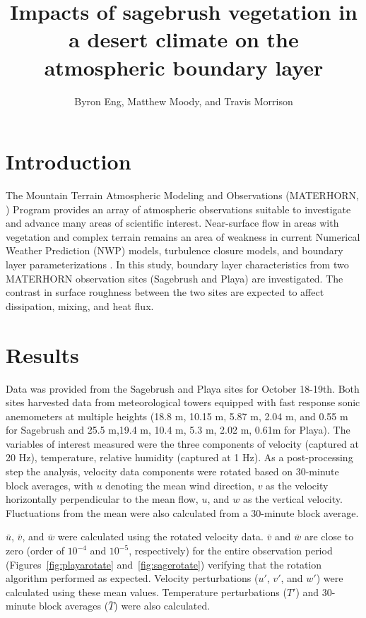 \documentclass[]{article}
\title{Impacts of sagebrush vegetation in a desert climate on the atmospheric boundary layer}
\author{Byron Eng, Matthew Moody, and Travis Morrison}
\begin{document}
\maketitle


\section{Introduction}
The Mountain Terrain Atmospheric Modeling and Observations (MATERHORN, \citealt{MATERHORN}) Program provides an array of atmospheric observations suitable to investigate and advance many areas of scientific interest. Near-surface flow in areas with vegetation and complex terrain remains an area of weakness in current Numerical Weather Prediction (NWP) models, turbulence closure models, and boundary layer parameterizations \citep{MATERHORN}. In this study, boundary layer characteristics from two MATERHORN observation sites (Sagebrush and Playa) are investigated. The contrast in surface roughness between the two sites are expected to affect dissipation, mixing, and heat flux.

\section{Results}
Data was provided from the Sagebrush and Playa sites for October 18-19th. Both sites harvested data from meteorological towers equipped with fast response sonic anemometers at multiple heights (18.8 m, 10.15 m, 5.87 m, 2.04 m, and 0.55 m for Sagebrush and 25.5 m,19.4 m, 10.4 m, 5.3 m, 2.02 m, 0.61m for Playa). The variables of interest measured were the three components of velocity (captured at 20 Hz), temperature, relative humidity (captured at 1 Hz). As a post-processing step the analysis,  velocity data components were rotated based on 30-minute block averages, with $u$ denoting the mean wind direction, $v$ as the velocity horizontally perpendicular to the mean flow, $u$, and $w$ as the vertical velocity. Fluctuations from the mean were also calculated from a 30-minute block average. 

$\bar{u}$, $\bar{v}$, and $\bar{w}$ were calculated using the rotated velocity data. $\bar{v}$ and $\bar{w}$ are close to zero (order of $10^{-4}$ and $10^{-5}$, respectively) for the entire observation period (Figures~\ref{fig:playarotate} and~\ref{fig:sagerotate}) verifying that the rotation algorithm performed as expected. Velocity perturbations ($u'$, $v'$, and $w'$) were calculated using these mean values. Temperature perturbations ($T'$) and 30-minute block averages ($\bar{T}$) were also calculated.
\end{document}
